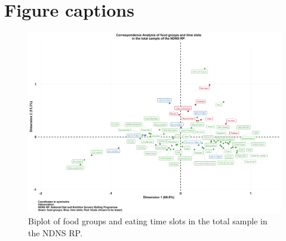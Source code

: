 \documentclass[utf8]{frontiersSCNS}
\providecommand{\DIFaddbeginFL}{} %
\providecommand{\DIFaddendFL}{} %
\providecommand{\DIFdelbeginFL}{} %
\providecommand{\DIFdelendFL}{} %
\newcommand{\DIFscaledelfig}{0.5}
\newlength{\DIFdelgraphicswidth} %
\newlength{\DIFdelgraphicsheight} %
\newcommand{\DIFaddincludegraphics}[2][]{{\color{blue}\fbox{\DIFOincludegraphics[#1]{#2}}}} %
\newcommand{\DIFdelincludegraphics}[2][]{%
\sbox{\DIFdelgraphicsbox}{\DIFOincludegraphics[#1]{#2}}%
\settoboxwidth{\DIFdelgraphicswidth}{\DIFdelgraphicsbox} %
\settoboxtotalheight{\DIFdelgraphicsheight}{\DIFdelgraphicsbox} %
\scalebox{\DIFscaledelfig}{%
\parbox[b]{\DIFdelgraphicswidth}{\usebox{\DIFdelgraphicsbox}\\[-\baselineskip] \rule{\DIFdelgraphicswidth}{0em}}\llap{\resizebox{\DIFdelgraphicswidth}{\DIFdelgraphicsheight}{%
\setlength{\unitlength}{\DIFdelgraphicswidth}%
\begin{picture}(1,1)%
\thicklines\linethickness{2pt} %
{\color[rgb]{1,0,0}\put(0,0){\framebox(1,1){}}}%
{\color[rgb]{1,0,0}\put(0,0){\line( 1,1){1}}}%
{\color[rgb]{1,0,0}\put(0,1){\line(1,-1){1}}}%
\end{picture}%
}\hspace*{3pt}}} %
} %
\DeclareRobustCommand{\DIFaddbeginFL}{\DIFOaddbeginFL \let\includegraphics\DIFaddincludegraphics} %
\DeclareRobustCommand{\DIFaddendFL}{\DIFOaddendFL \let\includegraphics\DIFOincludegraphics} %
\DeclareRobustCommand{\DIFdelbeginFL}{\DIFOdelbeginFL \let\includegraphics\DIFdelincludegraphics} %
\DeclareRobustCommand{\DIFdelendFL}{\DIFOaddendFL \let\includegraphics\DIFOincludegraphics} %
\begin{document}
\newpage
\begin{landscape}

\hypertarget{section}{%
\section*{}\label{section}}

\section*{Figure captions}

\begin{figure}[!ht]
\begin{center}
\DIFdelbeginFL %
\DIFdelendFL \DIFaddbeginFL \includegraphics[width=21.5cm]{Fig1_big.jpg}
\DIFaddendFL \end{center}
\caption{Biplot of food groups and eating time slots in the total sample in the NDNS RP.}\label{fig:fig1}
\end{figure}


\end{landscape}
\end{document}
